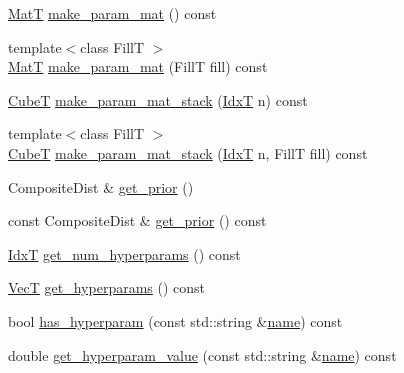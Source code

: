 \begin{DoxyCompactItemize}
\item 
\hyperlink{namespacemappel_a7091ab87c528041f7e2027195fad8915}{MatT} \hyperlink{classmappel_1_1PointEmitterModel_a8ede9fe8e3b6a3e621c2da72e23c7f9d}{make\+\_\+param\+\_\+mat} () const 
\item 
{\footnotesize template$<$class FillT $>$ }\\\hyperlink{namespacemappel_a7091ab87c528041f7e2027195fad8915}{MatT} \hyperlink{classmappel_1_1PointEmitterModel_a68a9c537f2f2725eb8fb9d3e250dd84b}{make\+\_\+param\+\_\+mat} (FillT fill) const 
\item 
\hyperlink{namespacemappel_ab2afab4e6c8805e83946670d882768c2}{CubeT} \hyperlink{classmappel_1_1PointEmitterModel_a57b98d5f8b2b5ed2c455bbf76b632f87}{make\+\_\+param\+\_\+mat\+\_\+stack} (\hyperlink{namespacemappel_ab17ec0f30b61ece292439d7ece81d3a8}{IdxT} n) const 
\item 
{\footnotesize template$<$class FillT $>$ }\\\hyperlink{namespacemappel_ab2afab4e6c8805e83946670d882768c2}{CubeT} \hyperlink{classmappel_1_1PointEmitterModel_a2c11fa045187c7ea9ba382141b5d53c1}{make\+\_\+param\+\_\+mat\+\_\+stack} (\hyperlink{namespacemappel_ab17ec0f30b61ece292439d7ece81d3a8}{IdxT} n, FillT fill) const 
\item 
Composite\+Dist \& \hyperlink{classmappel_1_1PointEmitterModel_a2182c250c15d590b582e76594e5f06b9}{get\+\_\+prior} ()
\item 
const Composite\+Dist \& \hyperlink{classmappel_1_1PointEmitterModel_a239826b8e6b914c0cdaa293f1f5ddfd4}{get\+\_\+prior} () const 
\item 
\hyperlink{namespacemappel_ab17ec0f30b61ece292439d7ece81d3a8}{IdxT} \hyperlink{classmappel_1_1PointEmitterModel_a442522cdaaa76be15b00a4f25110d7ec}{get\+\_\+num\+\_\+hyperparams} () const 
\item 
\hyperlink{namespacemappel_a2225ad69f358daa3f4f99282a35b9a3a}{VecT} \hyperlink{classmappel_1_1PointEmitterModel_a4085ade54f4b039c647bc9bf7804e007}{get\+\_\+hyperparams} () const 
\item 
bool \hyperlink{classmappel_1_1PointEmitterModel_afba2b17a81a506b0acd41616c8604412}{has\+\_\+hyperparam} (const std\+::string \&\hyperlink{classmappel_1_1Gauss2DsMAP_adb290940195572b2e22c3c8fce3f11c9}{name}) const 
\item 
double \hyperlink{classmappel_1_1PointEmitterModel_a3282cc59d5c6010a51f671ba72997705}{get\+\_\+hyperparam\+\_\+value} (const std\+::string \&\hyperlink{classmappel_1_1Gauss2DsMAP_adb290940195572b2e22c3c8fce3f11c9}{name}) const 

\end{DoxyCompactItemize}

